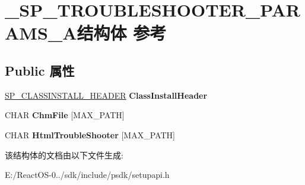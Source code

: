 \hypertarget{struct___s_p___t_r_o_u_b_l_e_s_h_o_o_t_e_r___p_a_r_a_m_s___a}{}\section{\+\_\+\+S\+P\+\_\+\+T\+R\+O\+U\+B\+L\+E\+S\+H\+O\+O\+T\+E\+R\+\_\+\+P\+A\+R\+A\+M\+S\+\_\+\+A结构体 参考}
\label{struct___s_p___t_r_o_u_b_l_e_s_h_o_o_t_e_r___p_a_r_a_m_s___a}
\subsection*{Public 属性}
\begin{DoxyCompactItemize}
\item 
\mbox{\label{struct___s_p___t_r_o_u_b_l_e_s_h_o_o_t_e_r___p_a_r_a_m_s___a_adc3d93e4ac2a72c4dc218732b910f206}} 
\hyperlink{struct___s_p___c_l_a_s_s_i_n_s_t_a_l_l___h_e_a_d_e_r}{S\+P\+\_\+\+C\+L\+A\+S\+S\+I\+N\+S\+T\+A\+L\+L\+\_\+\+H\+E\+A\+D\+ER} {\bfseries Class\+Install\+Header}
\item 
\mbox{\label{struct___s_p___t_r_o_u_b_l_e_s_h_o_o_t_e_r___p_a_r_a_m_s___a_a8002fd42c30dae23cb66b838f7e34599}} 
C\+H\+AR {\bfseries Chm\+File} \mbox{[}M\+A\+X\+\_\+\+P\+A\+TH\mbox{]}
\item 
\mbox{\label{struct___s_p___t_r_o_u_b_l_e_s_h_o_o_t_e_r___p_a_r_a_m_s___a_a8d4bc90ed664d30680863a0088900df4}} 
C\+H\+AR {\bfseries Html\+Trouble\+Shooter} \mbox{[}M\+A\+X\+\_\+\+P\+A\+TH\mbox{]}
\end{DoxyCompactItemize}


该结构体的文档由以下文件生成\+:\begin{DoxyCompactItemize}
\item 
E\+:/\+React\+O\+S-\/0../sdk/include/psdk/setupapi.\+h\end{DoxyCompactItemize}
